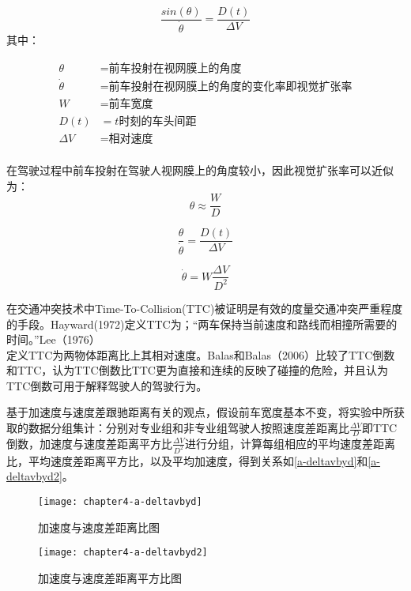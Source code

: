 \begin{equation}
\frac{sin(\theta)}{\dot{\theta}}=\frac{D(t)}{\Delta V}
\end{equation}
其中：



\begin{displaymath}
{\begin{aligned}
\theta&=\text{前车投射在视网膜上的角度}\\
\dot{\theta}&=\text{前车投射在视网膜上的角度的变化率即视觉扩张率}\\
W&=\text{前车宽度}\\
D(t)&=t\text{时刻的车头间距}\\
\Delta V&=\text{相对速度}\\
\end{aligned}}
\end{displaymath}


在驾驶过程中前车投射在驾驶人视网膜上的角度较小，因此视觉扩张率可以近似为：
\begin{equation}
\theta \approx \frac{W}{D}
\end{equation}


\begin{equation}
\frac{\theta}{\dot{\theta}}=\frac{D(t)}{\Delta V}
\end{equation}

\begin{equation}
\dot{\theta}=W\frac{\Delta V}{D^2}
\end{equation}

在交通冲突技术中Time-To-Collision(TTC)被证明是有效的度量交通冲突严重程度的手段。Hayward(1972)\cite{Hayward1972}定义TTC为；“两车保持当前速度和路线而相撞所需要的时间。”Lee（1976）\cite{Lee1976}定义TTC为两物体距离比上其相对速度。Balas和Balas（2006）\cite{Balas2006}比较了TTC倒数和TTC，认为TTC倒数比TTC更为直接和连续的反映了碰撞的危险，并且认为TTC倒数可用于解释驾驶人的驾驶行为。

基于加速度与速度差跟驰距离有关的观点，假设前车宽度基本不变，将实验中所获取的数据分组集计：分别对专业组和非专业组驾驶人按照速度差距离比$\frac{\Delta V}{D}$即TTC倒数，加速度与速度差距离平方比$\frac{\Delta V}{D^2}$进行分组，计算每组相应的平均速度差距离比，平均速度差距离平方比，以及平均加速度，得到关系如\autoref{a-deltavbyd}和\autoref{a-deltavbyd2}。

\begin{figure}[htbp]
\begin{minipage}[t]{0.48\linewidth}
\centering
\texttt{[image: chapter4-a-deltavbyd]}
\caption{加速度与速度差距离比图}
\label{a-deltavbyd}
\end{minipage}%
\hspace*{0.04\linewidth}
\begin{minipage}[t]{0.48\linewidth}
\centering
\texttt{[image: chapter4-a-deltavbyd2]}
\caption{加速度与速度差距离平方比图}
\label{a-deltavbyd2}
\end{minipage}
\end{figure}


